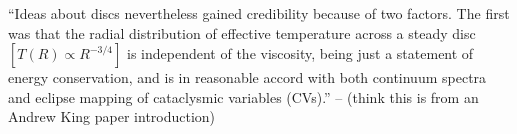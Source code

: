 \documentclass[11pt,a4paper]{article}
\begin{document}
``Ideas about discs nevertheless gained credibility because of two
factors. The first was that the radial distribution of effective
temperature across a steady disc $[ T (R) \propto R^{-3/4} ]$ is
independent of the viscosity, being just a statement of energy
conservation, and is in reasonable accord with both continuum spectra
and eclipse mapping of cataclysmic variables (CVs).'' -- (think this
is from an Andrew King paper introduction)

\fi
\end{document}
